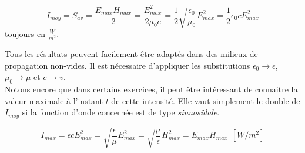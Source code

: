\[I_{moy} = S_{av} = \frac{ E_{max} H_{max}}{2} = \frac{E_{max}^{2}}{2\mu_0c} = \frac{1}{2} \sqrt{\frac{\epsilon_0}{\mu_0}} E_{max}^{2} = \frac{1}{2}\epsilon_0 c E_{max}^{2}\]
toujours en $\frac{W}{m^{2}}$.

Tous les résultats peuvent facilement être adaptés dans des milieux de propagation non-vides. Il est nécessaire d'appliquer les substitutions $\epsilon_0 \rightarrow \epsilon$, $\mu_0 \rightarrow \mu$ et $c \rightarrow v $.\\




Notons encore que dans certains exercices, il peut être intéressant de connaitre la valeur maximale à l'instant $t$ de cette intensité. Elle vaut simplement le double de $I_{moy}$ si la fonction d'onde concernée est de type \textit{sinuosïdale}. 

\[I_{max} = \epsilon c E_{max}^{2} = \sqrt{\frac{\epsilon}{\mu}}E_{max}^{2} = \sqrt{\frac{\mu}{\epsilon}}H_{max}^{2} = E_{max} H_{max} \hspace{5pt} [W/m^{2}]\]



